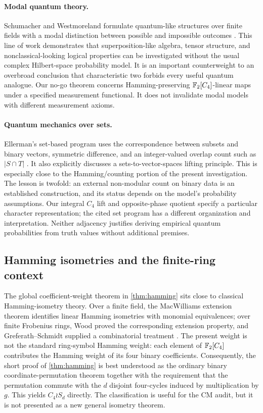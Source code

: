 \paragraph{Modal quantum theory.}
Schumacher and Westmoreland formulate quantum-like structures over finite fields with a modal distinction between possible and impossible outcomes \cite{modal}. This line of work demonstrates that superposition-like algebra, tensor structure, and nonclassical-looking logical properties can be investigated without the usual complex Hilbert-space probability model. It is an important counterweight to an overbroad conclusion that characteristic two forbids every useful quantum analogue. Our no-go theorem concerns Hamming-preserving $\mathbb F_2[C_4]$-linear maps under a specified measurement functional. It does not invalidate modal models with different measurement axioms.

\paragraph{Quantum mechanics over sets.}
Ellerman's set-based program uses the correspondence between subsets and binary vectors, symmetric difference, and an integer-valued overlap count such as $|S\cap T|$ \cite{ellerman}. It also explicitly discusses a sets-to-vector-spaces lifting principle. This is especially close to the Hamming/counting portion of the present investigation. The lesson is twofold: an external non-modular count on binary data is an established construction, and its status depends on the model's probability assumptions. Our integral $C_4$ lift and opposite-phase quotient specify a particular character representation; the cited set program has a different organization and interpretation. Neither adjacency justifies deriving empirical quantum probabilities from truth values without additional premises.


\subsection{Hamming isometries and the finite-ring context}
The global coefficient-weight theorem in \cref{thm:hamming} sits close to classical Hamming-isometry theory.  Over a finite field, the MacWilliams extension theorem identifies linear Hamming isometries with monomial equivalences; over finite Frobenius rings, Wood proved the corresponding extension property, and Greferath--Schmidt supplied a combinatorial treatment \cite{wood1999,greferath2000}.  The present weight is not the standard ring-symbol Hamming weight: each element of $\mathbb F_2[C_4]$ contributes the Hamming weight of its four binary coefficients.  Consequently, the short proof of \cref{thm:hamming} is best understood as the ordinary binary coordinate-permutation theorem together with the requirement that the permutation commute with the $d$ disjoint four-cycles induced by multiplication by $g$.  This yields $C_4\wr S_d$ directly.  The classification is useful for the CM audit, but it is not presented as a new general isometry theorem.

